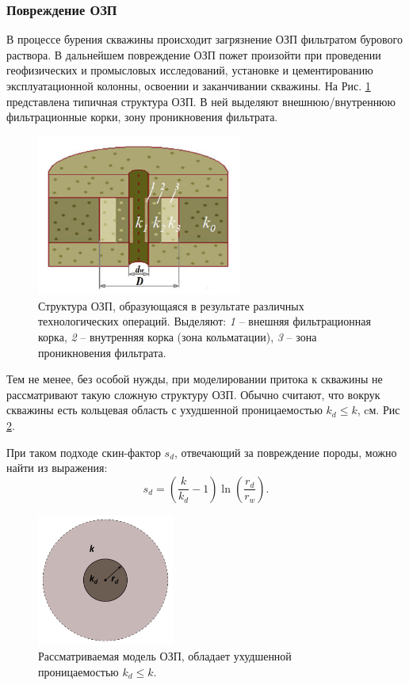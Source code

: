\subsubsection{Повреждение ОЗП}
	В процессе бурения скважины происходит загрязнение ОЗП фильтратом бурового раствора.
	В дальнейшем повреждение ОЗП пожет произойти при проведении геофизических и промысловых исследований, установке и цементированию эксплуатационной колонны, освоении и заканчивании скважины. На Рис. \ref{pic:near_wellbore} представлена типичная структура ОЗП. В ней выделяют внешнюю/внутреннюю фильтрационные корки, зону проникновения фильтрата.
\begin{figure}[H]
	\centerline{\includegraphics[width=0.6\textwidth]{pic/near-wellbore.png}}
	\caption{Структура ОЗП, образующаяся в результате различных технологических операций. Выделяют:
	\textit{1} -- внешняя фильтрационная корка,
	\textit{2} -- внутренняя корка (зона кольматации), 
	\textit{3} -- зона проникновения фильтрата.}
	\label{pic:near_wellbore}
\end{figure}

	Тем не менее, без особой нужды, при моделировании притока к скважины не рассматривают такую сложную структуру ОЗП. Обычно считают, что вокрук скважины есть кольцевая область с ухудшенной проницаемостью $k_d \leq k$, cм. Рис \ref{pic:near_wellbore_our}.

	При таком подходе скин-фактор $s_d$, отвечающий за повреждение породы, можно найти из выражения:
\begin{equation}
	\label{skin_damage}
	s_d = \left(\frac{k}{k_d}-1\right)\ln\left(\frac{r_d}{r_w}\right).
\end{equation}

\begin{figure}[H]
	\centerline{\includegraphics[width=0.4\textwidth]{pic/near-wellbore-our.png}}
	\caption{Рассматриваемая модель ОЗП, обладает ухудшенной проницаемостью $k_d \leq k$.}
	\label{pic:near_wellbore_our}
\end{figure}

